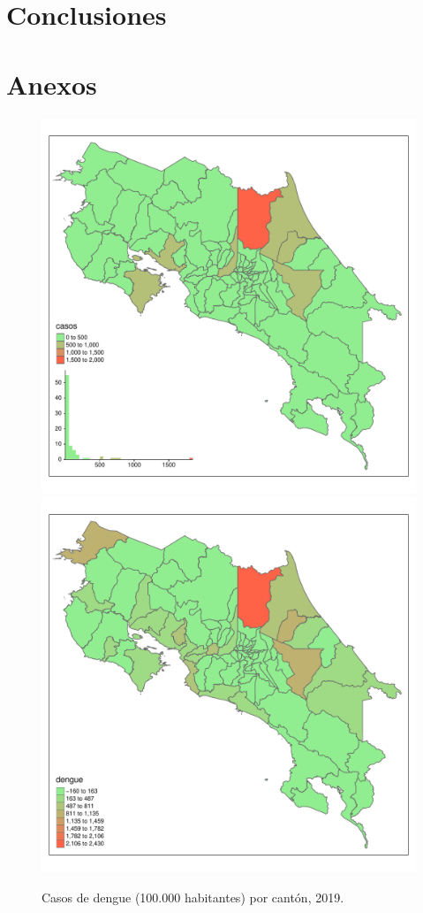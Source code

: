 \documentclass[12pt,a4paper]{article}
\begin{document}
\section{Conclusiones}

\section{Anexos}

\begin{figure}[hbtp]
\centering
\includegraphics[width=.48\textwidth]{FA1.pdf}
\includegraphics[width=.48\textwidth]{FA2.pdf}
\caption{Casos de dengue (100.000 habitantes) por cantón, 2019.}
\end{figure}
\end{document}
